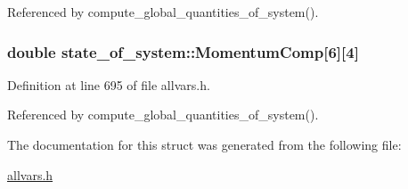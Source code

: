 Referenced by compute\_\-global\_\-quantities\_\-of\_\-system().

\hypertarget{structstate__of__system_a795ecb5f9b1749847bdb2d8d275323c1}{
\subsubsection[{MomentumComp}]{\setlength{\rightskip}{0pt plus 5cm}double {\bf state\_\-of\_\-system::MomentumComp}\mbox{[}6\mbox{]}\mbox{[}4\mbox{]}}}
\label{structstate__of__system_a795ecb5f9b1749847bdb2d8d275323c1}


Definition at line 695 of file allvars.h.



Referenced by compute\_\-global\_\-quantities\_\-of\_\-system().



The documentation for this struct was generated from the following file:\begin{DoxyCompactItemize}
\item 
\hyperlink{allvars_8h}{allvars.h}\end{DoxyCompactItemize}
